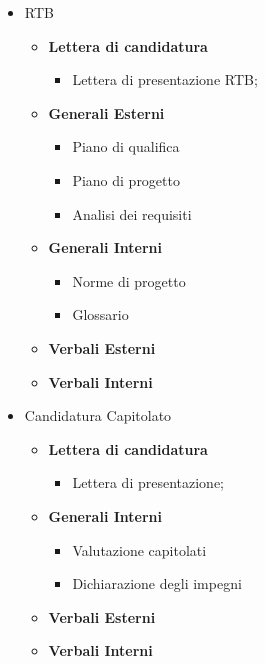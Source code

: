 \begin{itemize}
                \item RTB
                \begin{itemize}
                        \item \textbf{Lettera di candidatura}
                        \begin{itemize}
                                \item Lettera di presentazione RTB;
                        \end{itemize}
                        \item \textbf{Generali Esterni}
                        \begin{itemize}
                                \item Piano di qualifica
                                \item Piano di progetto
                                \item Analisi dei requisiti
                        \end{itemize}
                        \item \textbf{Generali Interni}
                        \begin{itemize}
                                \item Norme di progetto
                                \item Glossario
                        \end{itemize}
                        \item \textbf{Verbali Esterni}
                        \item \textbf{Verbali Interni}
                \end{itemize}

                \item Candidatura Capitolato
                \begin{itemize}
                        \item \textbf{Lettera di candidatura}
                        \begin{itemize}
                                \item Lettera di presentazione;
                        \end{itemize}
                        \item \textbf{Generali Interni}
                        \begin{itemize}
                                \item Valutazione capitolati
                                \item Dichiarazione degli impegni
                        \end{itemize}
                        \item \textbf{Verbali Esterni}
                        \item \textbf{Verbali Interni}
                \end{itemize}
        \end{itemize}

